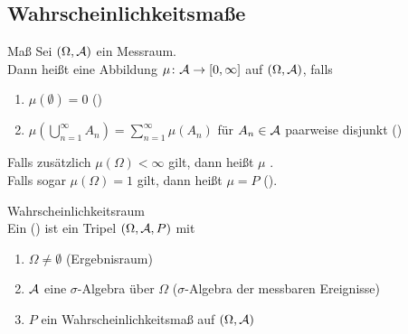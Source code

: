\subsection{%
    Wahrscheinlichkeitsmaße%
}

\begin{Def}{Maß}
    Sei $(\Omega, \mathcal{A})$ ein Messraum.\\
    Dann heißt eine Abbildung $\mu\colon \mathcal{A} \rightarrow [0, \infty]$ 
    auf $(\Omega, \mathcal{A})$, falls
    \begin{enumerate}
        \item
        $\mu(\emptyset) = 0$ ()

        \item
        $\mu(\bigcup_{n=1}^\infty A_n) = \sum_{n=1}^\infty \mu(A_n)$ für
        $A_n \in \mathcal{A}$ paarweise disjunkt ()
    \end{enumerate}
    Falls zusätzlich $\mu(\Omega) < \infty$ gilt, dann heißt $\mu$ .\\
    Falls sogar $\mu(\Omega) = 1$ gilt, dann heißt $\mu = P$ 
    ().
\end{Def}

\begin{Def}{Wahrscheinlichkeitsraum}\\
    Ein  () ist ein Tripel $(\Omega, \mathcal{A}, P)$ mit
    \begin{enumerate}
        \item
        $\Omega \not= \emptyset$ (Ergebnisraum)

        \item
        $\mathcal{A}$ eine $\sigma$-Algebra über $\Omega$ ($\sigma$-Algebra der messbaren Ereignisse)

        \item
        $P$ ein Wahrscheinlichkeitsmaß auf $(\Omega, \mathcal{A})$
    \end{enumerate}
\end{Def}

\linie
\pagebreak

